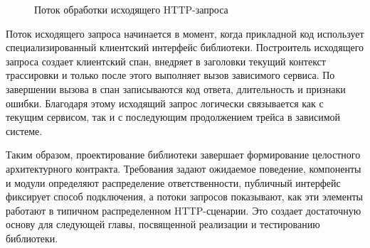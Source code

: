 \begin{figure}[H]
    \centering
    \caption{Поток обработки исходящего HTTP-запроса}
    \label{fig:outgoing-flow}
\end{figure}

Поток исходящего запроса начинается в момент, когда прикладной код использует
специализированный клиентский интерфейс библиотеки. Построитель исходящего запроса
создает клиентский спан, внедряет в заголовки текущий контекст трассировки и
только после этого выполняет вызов зависимого сервиса. По завершении вызова в
спан записываются код ответа, длительность и признаки ошибки. Благодаря этому
исходящий запрос логически связывается как с текущим сервисом, так и с
последующим продолжением трейса в зависимой системе.

Таким образом, проектирование библиотеки завершает формирование целостного
архитектурного контракта. Требования задают ожидаемое поведение, компоненты и
модули определяют распределение ответственности, публичный интерфейс фиксирует
способ подключения, а потоки запросов показывают, как эти элементы работают в
типичном распределенном HTTP-сценарии. Это создает достаточную основу для
следующей главы, посвященной реализации и тестированию библиотеки.
